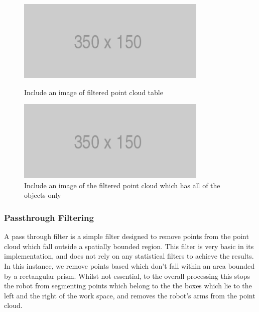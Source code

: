 \documentclass[a4paper]{article}
\begin{document}
\begin{figure}[h]
\begin{minipage}{0.45\linewidth}
\centering
\includegraphics[scale=0.5]{placeholder}
\caption{Include an image of filtered point cloud table}
\end{minipage}
\hspace{0.5cm}
\begin{minipage}{0.45\linewidth}
\centering
\includegraphics[scale=0.5]{placeholder}
\caption{Include an image of the filtered point cloud which has all of the objects only}
\end{minipage}
\end{figure}

\subsubsection{Passthrough Filtering}
A pass through filter is a simple filter designed to remove points from the point cloud which fall outside a spatially bounded region. This filter is very basic in its implementation, and does not rely on any statistical filters to achieve the results. In this instance, we remove points based which don't fall within an area bounded by a rectangular prism. Whilst not essential, to the overall processing this stops the robot from segmenting points which belong to the the boxes which lie to the left and the right of the work space, and removes the robot's arms from the point cloud.
\end{document}
